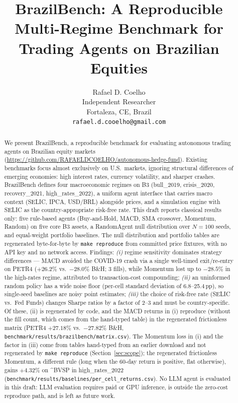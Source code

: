 \documentclass{article}
\title{BrazilBench: A Reproducible Multi-Regime Benchmark for\\
Trading Agents on Brazilian Equities}
\author{
  Rafael D. Coelho \\
  Independent Researcher \\
  Fortaleza, CE, Brazil \\
  \texttt{rafael.d.cooelho@gmail.com} \\
}
\begin{document}
\maketitle

\begin{abstract}
We present BrazilBench, a reproducible benchmark for evaluating
autonomous trading agents on Brazilian equity markets
(\url{https://github.com/RAFAELDCOELHO/autonomous-hedge-fund}).
Existing benchmarks focus almost exclusively on U.S.\ markets, ignoring
structural differences of emerging economies: high interest rates,
currency volatility, and sharper crashes. BrazilBench defines four
macroeconomic regimes on B3 (bull\_2019, crisis\_2020,
recovery\_2021, high\_rates\_2022), a uniform agent interface that
carries macro context (SELIC, IPCA, USD/BRL) alongside prices, and a
simulation engine with SELIC as the country-appropriate risk-free
rate. This draft reports classical results only: five rule-based
agents (Buy-and-Hold, MACD, SMA crossover, Momentum, Random) on five
core B3 assets, a RandomAgent null distribution over $N{=}100$ seeds,
and equal-weight portfolio baselines. The null distribution and
portfolio tables are regenerated byte-for-byte by \texttt{make
reproduce} from committed price fixtures, with no API key and no
network access. Findings: \emph{(i)} regime sensitivity dominates
strategy differences --- MACD avoided the COVID-19 crash via a single
well-timed exit/re-entry on PETR4 ($+26.2\%$ vs.\ $-28.0\%$ B\&H;
3 fills), while Momentum lost up to $-28.5\%$ in the high-rates
regime, attributed to transaction-cost compounding; \emph{(ii)} an uninformed
random policy has a wide noise floor (per-cell standard deviation of
6.8--25.4\,pp), so single-seed baselines are noisy point estimates;
\emph{(iii)} the choice of risk-free rate (SELIC vs.\ Fed Funds)
changes Sharpe ratios by a factor of 2--3 and must be
country-specific. Of these, (ii) is regenerated by code, and the MACD returns in (i) reproduce (without the fill count, which comes from the hand-typed table) in the regenerated frictionless matrix (PETR4 $+27.18\%$ vs.\ $-27.82\%$ B\&H, \texttt{benchmark/results/brazilbench/matrix.csv}). The Momentum loss in (i) and the factor in (iii) come from tables hand-typed from an earlier download and not regenerated by \texttt{make reproduce} (Section~\ref{sec:scope}); the regenerated frictionless Momentum, a different rule (long when the 60-day return is positive, flat otherwise), gains $+4.32\%$ on \textasciicircum BVSP in high\_rates\_2022 (\texttt{benchmark/results/baselines/per\_cell\_returns.csv}). No LLM agent is evaluated in this draft: LLM
evaluation requires paid or GPU inference, is outside the
zero-cost reproduce path, and is left as future work.
\end{abstract}
\end{document}
